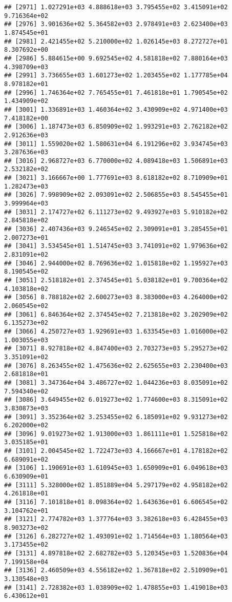 \documentclass[]{article}
\begin{document}
\begin{verbatim}
## [2971] 1.027291e+03 4.888618e+03 3.795455e+02 3.415091e+02 9.716364e+02
## [2976] 3.901636e+02 5.364582e+03 2.978491e+03 2.623400e+03 1.874545e+01
## [2981] 2.421455e+02 5.210000e+02 1.026145e+03 8.272727e+01 8.307692e+00
## [2986] 5.884615e+00 9.692545e+02 4.581818e+02 7.880164e+03 4.398709e+03
## [2991] 3.736655e+03 1.601273e+02 1.203455e+02 1.177785e+04 8.978182e+01
## [2996] 1.746364e+02 7.765455e+01 7.461818e+01 1.790545e+02 1.434909e+02
## [3001] 1.336891e+03 1.460364e+02 3.430909e+02 4.971400e+03 7.418182e+00
## [3006] 1.187473e+03 6.850909e+02 1.993291e+03 2.762182e+02 2.912636e+03
## [3011] 1.559020e+02 1.580631e+04 6.191296e+02 3.934745e+03 3.287636e+03
## [3016] 2.968727e+03 6.770000e+02 4.089418e+03 1.506891e+03 2.532182e+02
## [3021] 3.166667e+00 1.777691e+03 8.618182e+02 8.710909e+01 1.282473e+03
## [3026] 7.998909e+02 2.093091e+02 2.506855e+03 8.545455e+01 3.999964e+03
## [3031] 2.174727e+02 6.111273e+02 9.493927e+03 5.910182e+02 2.845818e+02
## [3036] 2.407436e+03 9.246545e+02 2.309091e+01 3.285455e+01 2.007273e+01
## [3041] 3.534545e+01 1.514745e+03 3.741091e+02 1.979636e+02 2.831091e+02
## [3046] 2.944000e+02 8.769636e+02 1.015818e+02 1.195927e+03 8.190545e+02
## [3051] 2.518182e+01 2.374545e+01 5.038182e+01 9.700364e+02 4.103818e+02
## [3056] 8.788182e+02 2.600273e+03 8.383000e+03 4.264000e+02 2.060545e+02
## [3061] 6.846364e+02 2.374545e+02 7.213818e+02 3.202909e+02 6.135273e+02
## [3066] 4.250727e+03 1.929691e+03 1.633545e+03 1.016000e+02 1.003055e+03
## [3071] 8.927818e+02 4.847400e+03 2.703273e+03 5.295273e+02 3.351091e+02
## [3076] 8.263455e+02 1.475636e+02 2.625655e+03 2.230400e+03 2.681818e+01
## [3081] 3.347364e+04 3.486727e+02 1.044236e+03 8.035091e+02 7.594340e+02
## [3086] 3.649455e+02 6.019273e+02 1.774600e+03 8.315091e+02 3.830873e+03
## [3091] 3.352364e+02 3.253455e+02 6.185091e+02 9.931273e+02 6.202000e+02
## [3096] 9.019273e+02 1.913000e+03 1.861111e+01 1.525818e+02 3.035185e+01
## [3101] 2.004545e+02 1.722473e+03 4.166667e+01 4.178182e+02 6.689091e+02
## [3106] 1.190691e+03 1.610945e+03 1.650909e+01 6.049618e+03 6.630909e+01
## [3111] 5.328000e+02 1.851889e+04 5.297179e+02 4.958182e+02 4.261818e+01
## [3116] 7.101818e+01 8.098364e+02 1.643636e+01 6.606545e+02 3.104762e+01
## [3121] 2.774782e+03 1.377764e+03 3.382618e+03 6.428455e+03 8.903273e+02
## [3126] 6.282727e+02 1.493091e+02 1.714564e+03 1.180564e+03 3.173455e+02
## [3131] 4.897818e+02 2.682782e+03 5.120345e+03 1.520836e+04 7.199158e+04
## [3136] 2.460509e+03 4.556182e+02 1.367818e+02 2.510909e+01 3.130548e+03
## [3141] 2.728382e+03 1.038909e+02 1.478855e+03 1.419018e+03 6.430612e+01

\end{verbatim}
\end{document}
